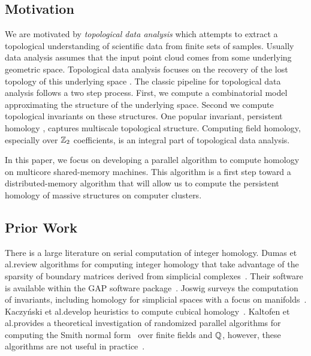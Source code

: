 \documentclass{elsarticle}
\begin{document}
\subsection{Motivation}
We are motivated by \emph{topological data analysis} 
which attempts to extract a topological understanding of scientific data from 
finite sets of samples. Usually data analysis assumes that the input point cloud
comes from some underlying geometric space. Topological data analysis focuses on
the recovery of the lost topology of this underlying space \cite{c-tnd-09}. 
The classic pipeline for topological data analysis follows a two step process. First, we 
compute a combinatorial model approximating the structure of the underlying 
space. Second we compute topological invariants on these structures. One popular
invariant, persistent homology \cite{elz-tps-02, zc-cph-05}, captures multiscale
topological structure. Computing field homology, 
especially over $\mathbb{Z}_2$ coefficients, is an integral part of topological data 
analysis.

In this paper, we focus on developing a parallel algorithm to compute homology 
on multicore shared-memory machines. This algorithm is a first step toward a 
distributed-memory algorithm that will allow us to compute the persistent homology of 
massive structures on computer clusters.

\subsection{Prior Work}
There is a large literature on serial computation of integer homology.
Dumas et al.\@ review algorithms for computing integer homology that take 
advantage of the sparsity of boundary matrices derived from simplicial 
complexes~\cite{d-snf-03}. Their software is available within the GAP software 
package~\cite{GAP4}. Joswig surveys the computation of invariants, including 
homology for simplicial spaces with a focus on manifolds~\cite{j-csm-04}.
Kaczy{\'n}ski et al.\@ develop heuristics to compute cubical 
homology~\cite{kmm-ch-04}. Kaltofen et al.\@ provides a theoretical
investigation of randomized parallel algorithms for computing the Smith normal 
form~\cite{kks-snf-87,kks-snf-89} over finite fields and $\mathbb{Q}$, however, 
these algorithms are not useful in practice~\cite{ProofByAuthority}.
\end{document}
